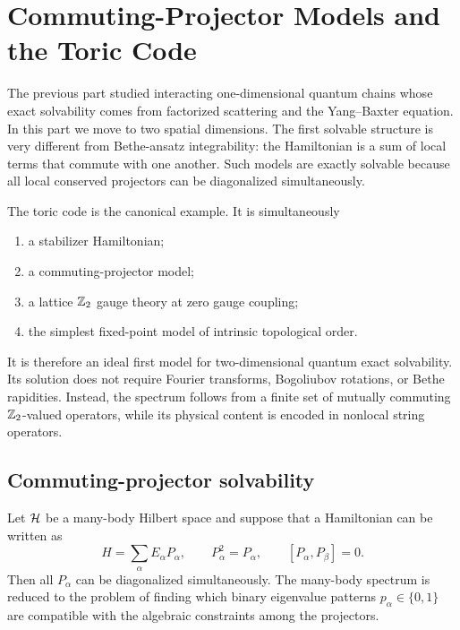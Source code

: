 \chapter{Commuting-Projector Models and the Toric Code}
\label{chap:commuting-projector-toric-code}

The previous part studied interacting one-dimensional quantum chains whose exact
solvability comes from factorized scattering and the Yang--Baxter equation.  In
this part we move to two spatial dimensions.  The first solvable structure is
very different from Bethe-ansatz integrability: the Hamiltonian is a sum of
local terms that commute with one another.  Such models are exactly solvable
because all local conserved projectors can be diagonalized simultaneously.

The toric code is the canonical example.  It is simultaneously
\begin{enumerate}[label=(\roman*)]
    \item a stabilizer Hamiltonian;
    \item a commuting-projector model;
    \item a lattice \(\mathbb{Z}_2\) gauge theory at zero gauge coupling;
    \item the simplest fixed-point model of intrinsic topological order.
\end{enumerate}
It is therefore an ideal first model for two-dimensional quantum exact
solvability.  Its solution does not require Fourier transforms, Bogoliubov
rotations, or Bethe rapidities.  Instead, the spectrum follows from a finite set
of mutually commuting \(\mathbb{Z}_2\)-valued operators, while its physical content is
encoded in nonlocal string operators.

\section{Commuting-projector solvability}
\label{sec:commuting-projector-principle}

Let \(\mathcal{H}\) be a many-body Hilbert space and suppose that a Hamiltonian can be
written as
\begin{equation}
\label{eq:commuting-projector-general-form}
    H=\sum_{\alpha} E_{\alpha} P_{\alpha},
    \qquad
    P_{\alpha}^2=P_{\alpha},
    \qquad
    [P_{\alpha},P_{\beta}]=0 .
\end{equation}
Then all \(P_{\alpha}\) can be diagonalized simultaneously.  The many-body
spectrum is reduced to the problem of finding which binary eigenvalue patterns
\(p_{\alpha}\in\{0,1\}\) are compatible with the algebraic constraints among the
projectors.

